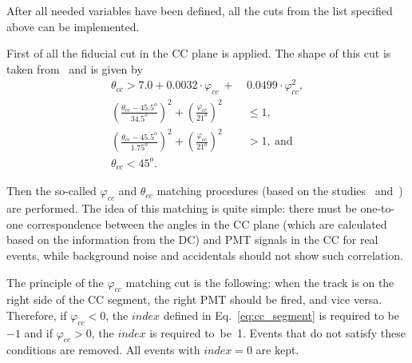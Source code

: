 
After all needed variables have been defined, all the cuts from the list specified above can be implemented.

First of all the fiducial cut in the CC plane is applied. The shape of this cut is taken from~\cite{Khetarpal:2010} and is given by
\begin{equation}
\begin{aligned}
\theta_{cc} > 7.0+0.0032\cdot \varphi_{cc}~+~&0.0499\cdot \varphi_{cc}^{2}, \\
\left( \frac{\theta_{cc}-45.5^{o}}{34.5^{o}} \right)^{2} + \left( \frac{\varphi_{cc}}{21^{o}} \right)^{2} &\le 1, \\
\left( \frac{\theta_{cc}-45.5^{o}}{1.75^{o}} \right)^{2} + \left( \frac{\varphi_{cc}}{21^{o}} \right)^{2} &> 1,~\textrm{and} \\
\theta_{cc} < 45^{o}. \, \, \,  \, \, \, \, \, \,   \, \, \,  \, \, \, \, \, \,
\label{eq:cc_fiduch}
\end{aligned}
\end{equation}\vspace{-1em}

Then the so-called $\varphi_{cc}$ and $\theta_{cc}$ matching procedures (based on the studies~\cite{Osipenko:2004} and~\cite{Ungaro:2010}) are performed. The idea of this matching is quite simple: there must be one-to-one correspondence between the angles in the CC plane (which are calculated based on the information from the DC) and PMT signals in the CC for real events, while background noise and accidentals should not show such correlation.

The principle of the $\varphi_{cc}$ matching cut is the following: when the track is on the right side of the CC segment, the right PMT should be fired, and vice versa. Therefore, if $\varphi_{cc}<0$, the $index$ defined in Eq.~\eqref{eq:cc_segment} is required to be $-1$ and if $\varphi_{cc}>0$, the $index$ is required to~be~1. Events that do not satisfy these conditions are removed. All events with $index=0$ are kept.

